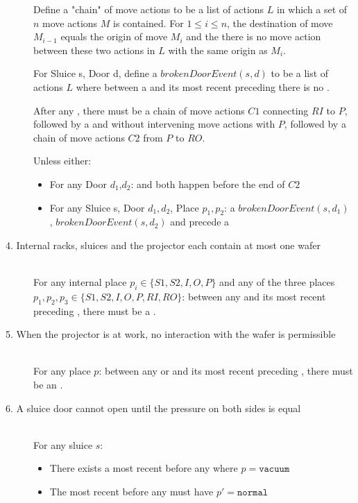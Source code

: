 \begin{description}
 Define a "chain" of move actions to be a list of actions $L$  in which a set of $n$ move actions $M$ is contained. For $1 \leq i \leq n$, the destination of move $M_{i-1}$ equals the origin of move $M_{i}$ and the there is no move action between these two actions in $L$ with the same origin as $M_{i}$.
 
For Sluice s, Door d, define a $brokenDoorEvent(s,d)$  to be a list of actions $L$ where between a  and its most recent preceding  there is no .
 
 After any , there must be a chain of move actions $C1$ connecting $RI$ to $P$, followed by a  and  without intervening move actions with $P$, followed by a chain of move actions $C2$ from $P$ to $RO$.
 
 Unless either:
 \begin{itemize}
 \item For any Door $d_1$,$d_2$:  and  both happen before the end of $C2$
 
 \item For any Sluice s, Door $d_1,d_2$, Place $p_1,p_2$: a $brokenDoorEvent(s,d_1)$ , $brokenDoorEvent(s,d_2)$ and   precede a  
 \end{itemize}
 
 
\item[4. Internal racks, sluices and the projector each contain at most one wafer] \hfill \\
For any internal place $p_i \in \{S1, S2, I, O, P\}$ and any of the three places $p_1, p_2, p_3 \in \{S1, S2, I, O, P, RI, RO\}$: between any  and its most recent preceding , there must be a . 
 
\item[5. When the projector is at work, no interaction with the wafer is permissible] \hfill \\
For any place $p$: between any  or  and its most recent preceding , there must be an . 
 
 \item[6. A sluice door cannot open until the pressure on both sides is equal] \hfill \\
 For any sluice $s$:
 \begin{itemize}
  \item There exists a most recent  before any  where $p = \texttt{vacuum}$
  \item The most recent  before any  must have $p' = \texttt{normal}$


\end{itemize}
\end{description}

